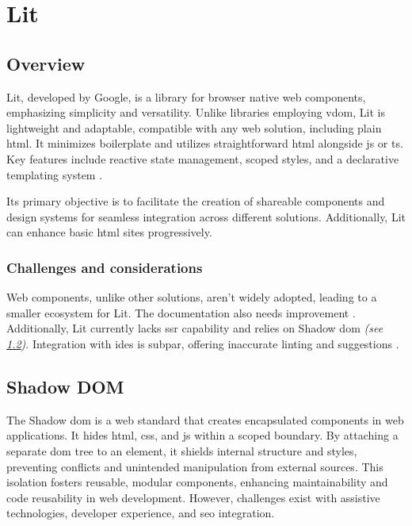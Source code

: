 \section{Lit}
\label{sec:lit}

\subsection{Overview}
\label{subsec:lit:overview}

Lit, developed by Google, is a library for browser native web components, emphasizing simplicity and versatility. Unlike libraries employing \acrshort{vdom}, Lit is lightweight and adaptable, compatible with any web solution, including plain \acrshort{html}. It minimizes boilerplate and utilizes straightforward \acrshort{html} alongside \acrshort{js} or \acrshort{ts}. Key features include reactive state management, scoped styles, and a declarative templating system \cite{lit:intro}.

Its primary objective is to facilitate the creation of shareable components and design systems for seamless integration across different solutions. Additionally, Lit can enhance basic \acrshort{html} sites progressively.

\subsubsection{Challenges and considerations}

Web components, unlike other solutions, aren't widely adopted, leading to a smaller ecosystem for Lit. The documentation also needs improvement \cite{github:issue_lit}. Additionally, Lit currently lacks \acrshort{ssr} capability and relies on Shadow \acrshort{dom} \textit{(see \ref{subsec:lit:shadow_dom})}. Integration with \acrshort{ide}s is subpar, offering inaccurate linting and suggestions \cite{lit:ssr, designsystemcentral:web_components, mitosis:overview}.

\subsection{Shadow DOM}
\label{subsec:lit:shadow_dom}

The Shadow \acrshort{dom} is a web standard that creates encapsulated components in web applications. It hides \acrshort{html}, \acrshort{css}, and \acrlong{js} within a scoped boundary. By attaching a separate \acrshort{dom} tree to an element, it shields internal structure and styles, preventing conflicts and unintended manipulation from external sources. This isolation fosters reusable, modular components, enhancing maintainability and code reusability in web development. \cite{mdn:shadow_dom} However, challenges exist with assistive technologies, developer experience, and \acrshort{seo} integration. \cite{designsystemcentral:web_components, manuel:shadow_dom}

